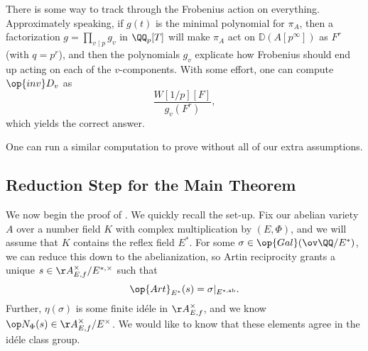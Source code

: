 \documentclass[../notes.tex]{subfiles}
\begin{document}
There is some way to track through the Frobenius action on everything. Approximately speaking, if $g(t)$ is the minimal polynomial for $\pi_A$, then a factorization $g=\prod_{v\mid p}g_v$ in $\QQ_p[T]$ will make $\pi_A$ act on $\mathbb D(A[p^\infty])$ as $F^r$ (with $q=p^r$), and then the polynomials $g_v$ explicate how Frobenius should end up acting on each of the $v$-components. With some effort, one can compute $\op{inv}D_v$ as
\[\frac{W[1/p][F]}{g_v(F^r)},\]
which yields the correct answer.
\begin{remark}
	One can run a similar computation to prove  without all of our extra assumptions.
\end{remark}

\subsection{Reduction Step for the Main Theorem}
We now begin the proof of . We quickly recall the set-up. Fix our abelian variety $A$ over a number field $K$ with complex multiplication by $(E,\Phi)$, and we will assume that $K$ contains the reflex field $E^*$. For some $\sigma\in\op{Gal}(\ov\QQ/E^*)$, we can reduce this down to the abelianization, so Artin reciprocity grants a unique $s\in\AA^\times_{E,f}/E^{*,\times}$ such that
\[\op{Art}_{E^*}(s)=\sigma|_{E^{*,\mathrm{ab}}}.\]
Further, $\eta(\sigma)$ is some finite id\'ele in $\AA^\times_{E,f}$, and we know $\op N_\Phi(s)\in\AA^\times_{E,f}/E^\times$. We would like to know that these elements agree in the id\'ele class group.
\end{document}

